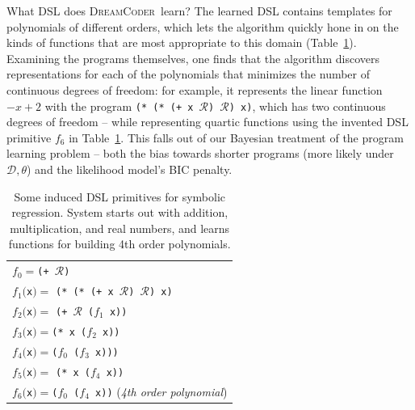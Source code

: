 \documentclass{article}
\newcommand{\system}{\textsc{DreamCoder}~}
\newcommand{\code}[1]{{\footnotesize\texttt{#1}}}
\newcommand{\probability}{\mathds{P}} %
\begin{document}

What DSL does \system learn?
The learned DSL contains templates for polynomials of different orders,
which lets the algorithm quickly hone in on the kinds of functions that are most appropriate to this domain (Table~\ref{regressionDSL}).
Examining the programs themselves,
one finds that the algorithm discovers representations for each of the polynomials that minimizes the number of continuous degrees of freedom:
for example, it represents the linear function $-x+2$ with the program 
\code{(* (* (+ x }$\mathcal{R}$\code{) }$\mathcal{R}$\code{) x)}, which has two continuous degrees of freedom -- while representing quartic functions using the invented DSL primitive $f_6$ in Table~\ref{regressionDSL}.
This falls out of our Bayesian treatment of the program learning problem -- both the bias towards shorter programs (more likely under $\mathcal{D},\theta$) and the likelihood model's BIC penalty.
\begin{table}\centering
\begin{tabular}{l}
  \toprule
    $f_0 = $\code{(+ }$\mathcal{R}$\code{)}\\
    $f_1($\code{x}$) =$ \code{(* (* (+ x }$\mathcal{R}$\code{) }$\mathcal{R}$\code{) x)} \\
      $f_2($\code{x}$) =$ \code{(+ }$\mathcal{R}$\code{ ($f_1$ x))} \\
      $f_3($\code{x}$) = $\code{(* x (}$f_2$\code{ x))}\\
  $f_4($\code{x}$) = $\code{(}$f_0$\code{ (}$f_3$\code{ x)))}\\
  $f_5($\code{x}$) =$ \code{(* x (}$f_4$\code{ x))}\\
  $f_6($\code{x}$) = $\code{(}$f_0$\code{ (}$f_4$\code{ x))} (\emph{4th order polynomial})
  \\\bottomrule
\end{tabular}
\caption{Some induced DSL primitives for symbolic regression. System starts out with addition, multiplication, and real numbers, and learns functions for building 4th order polynomials.}\label{regressionDSL}
\end{table}
\end{document}
